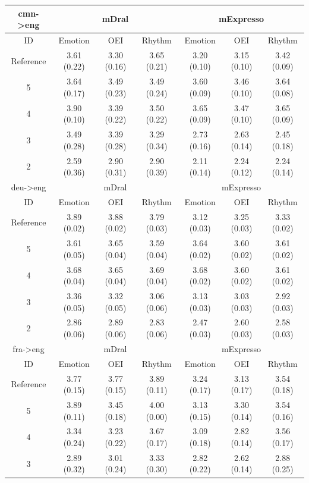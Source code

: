 \begin{table}[!ht]
\tiny
\centering
\begin{tabular}{c|ccc|ccc}
\hline
cmn->eng & \multicolumn{3}{c|}{mDral} & \multicolumn{3}{c|}{mExpresso}\\
\hline
ID & Emotion & OEI & Rhythm & Emotion & OEI & Rhythm \\
\hline
Reference & 3.61 (0.22) & 3.30 (0.16) & 3.65 (0.21) & 3.20 (0.10) & 3.15 (0.10) & 3.42 (0.09)\\
5 & 3.64 (0.17) & 3.49 (0.23) & 3.49 (0.24) & 3.60 (0.09) & 3.46 (0.10) & 3.64 (0.08)\\
4 & 3.90 (0.10) & 3.39 (0.22) & 3.50 (0.22) & 3.65 (0.09) & 3.47 (0.10) & 3.65 (0.09)\\
3 & 3.49 (0.28) & 3.39 (0.28) & 3.29 (0.34) & 2.73 (0.16) & 2.63 (0.14) & 2.45 (0.18)\\
2 & 2.59 (0.36) & 2.90 (0.31) & 2.90 (0.39) & 2.11 (0.14) & 2.24 (0.12) & 2.24 (0.14)\\
\hline
deu->eng & \multicolumn{3}{c|}{mDral} & \multicolumn{3}{c|}{mExpresso}\\
\hline
ID & Emotion & OEI & Rhythm & Emotion & OEI & Rhythm \\
\hline
Reference & 3.89 (0.02) & 3.88 (0.02) & 3.79 (0.03) & 3.12 (0.03) & 3.25 (0.03) & 3.33 (0.02)\\
5 & 3.61 (0.05) & 3.65 (0.04) & 3.59 (0.04) & 3.64 (0.02) & 3.60 (0.02) & 3.61 (0.02)\\
4 & 3.68 (0.04) & 3.65 (0.04) & 3.69 (0.04) & 3.68 (0.02) & 3.60 (0.02) & 3.61 (0.02)\\
3 & 3.36 (0.05) & 3.32 (0.05) & 3.06 (0.06) & 3.13 (0.03) & 3.03 (0.03) & 2.92 (0.03)\\
2 & 2.86 (0.06) & 2.89 (0.06) & 2.83 (0.06) & 2.47 (0.03) & 2.60 (0.03) & 2.58 (0.03)\\
\hline
fra->eng & \multicolumn{3}{c|}{mDral} & \multicolumn{3}{c|}{mExpresso}\\
\hline
ID & Emotion & OEI & Rhythm & Emotion & OEI & Rhythm \\
\hline
Reference & 3.77 (0.15) & 3.77 (0.15) & 3.89 (0.11) & 3.24 (0.17) & 3.13 (0.17) & 3.54 (0.18)\\
5 & 3.89 (0.11) & 3.45 (0.18) & 4.00 (0.00) & 3.13 (0.15) & 3.30 (0.14) & 3.54 (0.16)\\
4 & 3.34 (0.24) & 3.23 (0.22) & 3.67 (0.17) & 3.09 (0.18) & 2.82 (0.14) & 3.56 (0.17)\\
3 & 2.89 (0.32) & 3.01 (0.24) & 3.33 (0.30) & 2.82 (0.22) & 2.62 (0.14) & 2.88 (0.25)\\

\end{tabular}
\end{table}
